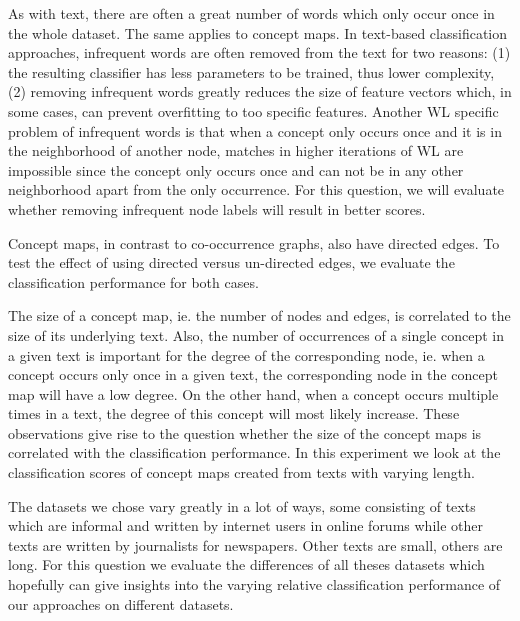 As with text, there are often a great number of words which only occur once in the whole dataset.
The same applies to concept maps.
In text-based classification approaches, infrequent words are often removed from the text for two reasons: (1) the resulting classifier has less parameters to be trained, thus lower complexity, (2) removing infrequent words greatly reduces the size of feature vectors which, in some cases, can prevent overfitting to too specific features.
Another WL specific problem of infrequent words is that when a concept only occurs once and it is in the neighborhood of another node, matches in higher iterations of WL are impossible since the concept only occurs once and can not be in any other neighborhood apart from the only occurrence.
For this question, we will evaluate whether removing infrequent node labels will result in better scores.

Concept maps, in contrast to co-occurrence graphs, also have directed edges.
To test the effect of using directed versus un-directed edges, we evaluate the classification performance for both cases.

The size of a concept map, ie. the number of nodes and edges, is correlated to the size of its underlying text.
Also, the number of occurrences of a single concept in a given text is important for the degree of the corresponding node, ie. when a concept occurs only once in a given text, the corresponding node in the concept map will have a low degree.
On the other hand, when a concept occurs multiple times in a text, the degree of this concept will most likely increase.
These observations give rise to the question whether the size of the concept maps is correlated with the classification performance.
In this experiment we look at the classification scores of concept maps created from texts with varying length.

The datasets we chose vary greatly in a lot of ways, some consisting of texts which are informal and written by internet users in online forums while other texts are written by journalists for newspapers.
Other texts are small, others are long.
For this question we evaluate the differences of all theses datasets which hopefully can give insights into the varying relative classification performance of our approaches on different datasets.

